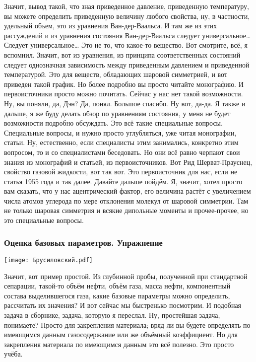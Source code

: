 \documentclass[main.tex]{subfiles}
\begin{document}
Значит, вывод такой, что зная приведенное давление, приведенную температуру, вы можете определить приведенную величину любого свойства, ну, в частности, удельный объем, это из уравнения Ван-дер-Ваальса.
И там же из этих рассуждений и из уравнения состояния Ван-дер-Ваальса следует универсальное…
Следует универсальное…
Это не то, что какое-то вещество.
Вот смотрите, всё, я вспомнил.
Значит, вот из уравнения, из принципа соответственных состояний следует однозначная зависимость между приведенным давлением и приведенной температурой.
Это для веществ, обладающих шаровой симметрией, и вот приведен такой график.
Но более подробно вы просто читайте монографию.
И первоисточники просто можно почитать.
Сейчас у нас нет такой возможности.
Ну, вы поняли, да, Дэн?
Да, понял.
Большое спасибо.
Ну вот, да-да.
Я также и дальше, я же буду делать обзор по уравнениям состояния, у меня не будет возможности подробно обсуждать.
Это всё такие специальные вопросы.
Специальные вопросы, и нужно просто углубляться, уже читая монографии, статьи.
Ну, естественно, если специалисты этим занимались, конкретно этим вопросом, то и со специалистами беседовать.
Но они всё равно черпают свои знания из монографий и статьей, из первоисточников.
Вот Рид Шерват-Прауснец, свойство газовой жидкости, вот так вот.
Это первоисточник для нас, если не статья 1955 года и так далее.
Давайте дальше пойдём.
Я, значит, хотел просто вам сказать, что у нас ацентрический фактор, его величина растёт с увеличением числа атомов углерода по мере отклонения молекул от шаровой симметрии.
Там не только шаровая симметрия и всякие дипольные моменты и прочее-прочее, но это специальные вопросы.

\subsubsection{Оценка базовых параметров. Упражнение}

\begin{center}
\texttt{[image: Брусиловский.pdf]}
\end{center}

Значит, вот пример простой.
Из глубинной пробы, полученной при стандартной сепарации, такой-то объём нефти, объём газа, масса нефти, компонентный состава выделившегося газа, какие базовые параметры можно определить, рассчитать их значения?
И вот сейчас мы быстренько посмотрим.
И подобная задача в сборнике, задача, которую я переслал.
Ну, простейшая задача, понимаете?
Просто для закрепления материала; вряд ли вы будете определять по имеющимся данным газосодержание или же объёмный коэффициент.
Но для закрепления материала по имеющимся данным это всё полезно.
Это просто учёба.
\end{document}
